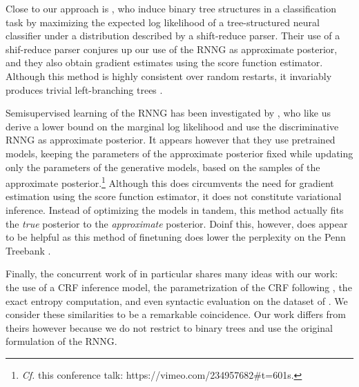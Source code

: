   Close to our approach is \citet{yogatama2016reinforcement}, who induce binary tree structures in a classification task by maximizing the expected log likelihood of a tree-structured neural classifier under a distribution described by a shift-reduce parser. Their use of a shif-reduce parser conjures up our use of the RNNG as approximate posterior, and they also obtain gradient estimates using the score function estimator. Although this method is highly consistent over random restarts, it invariably produces trivial left-branching trees \citet{williams2018latent}.

  Semisupervised learning of the RNNG has been investigated by \citet{cheng2017rnng}, who like us derive a lower bound on the marginal log likelihood and use the discriminative RNNG as approximate posterior. It appears however that they use pretrained models, keeping the parameters of the approximate posterior fixed while updating only the parameters of the generative models, based on the samples of the approximate posterior.\footnote{\textit{Cf.} this conference talk: https://vimeo.com/234957682#t=601s.} Although this does circumvents the need for gradient estimation using the score function estimator, it does not constitute variational inference. Instead of optimizing the models in tandem, this method actually fits the \textit{true} posterior to the \textit{approximate} posterior. Doinf this, however, does appear to be helpful as this method of finetuning does lower the perplexity on the Penn Treebank \citep{cheng2017rnng}.

  Finally, the concurrent work of \citet{kim2019unsupervised} in particular shares many ideas with our work: the use of a CRF inference model, the parametrization of the CRF following \citet{stern2017minimal}, the exact entropy computation, and even syntactic evaluation on the dataset of \citet{linzen2018targeted}. We consider these similarities to be a remarkable coincidence. Our work differs from theirs however because we do not restrict to binary trees and use the original formulation of the RNNG.


